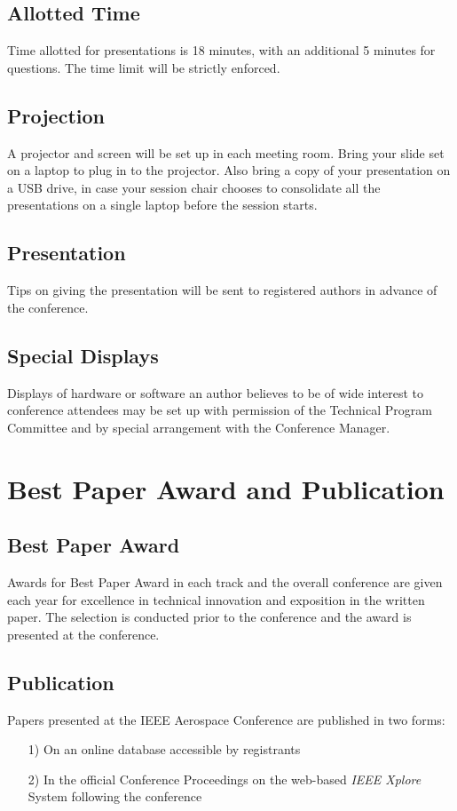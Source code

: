 \documentclass[twocolumn,letterpaper]{IEEEAerospaceCLS}  %
\begin{document}
\subsection{Allotted Time}
Time allotted for presentations is 18 minutes, with an additional 5 minutes for questions. The time limit will be strictly enforced.

\subsection{Projection}
A projector and screen will be set up in each meeting room. Bring your slide set on a laptop to plug in to the projector. Also bring a copy of your presentation on a USB drive, in case your session chair chooses to consolidate all the presentations on a single laptop before the session starts.

\subsection{Presentation}
Tips on giving the presentation will be sent to registered authors in advance of the conference.


\subsection{Special Displays}
Displays of hardware or software an author believes to be of wide interest to conference attendees may be set up with permission of the Technical Program Committee and by special arrangement with the Conference Manager.

\section{Best Paper Award and Publication}
\subsection{Best Paper Award}
Awards for Best Paper Award in each track and the overall conference are given each year for excellence in technical innovation and exposition in the written paper. The selection is conducted prior to the conference and the award is presented at the conference.

\subsection{Publication}
Papers presented at the IEEE Aerospace Conference are published in two forms:
\begin{itemize}
  \item [1)] On an online database accessible by registrants \\
  \item [2)] In the official Conference Proceedings on the web-based {\it{IEEE Xplore}} System following the conference
\end{itemize}
\end{document}
